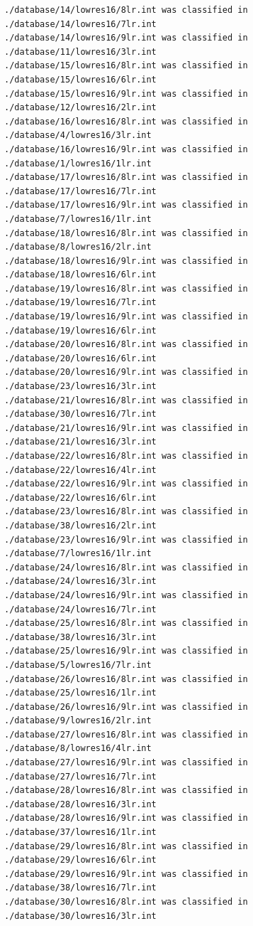 \documentclass[a4paper,11pt,titlepage]{article}
\begin{document}
\begin{verbatim}
./database/14/lowres16/8lr.int was classified in ./database/14/lowres16/7lr.int
./database/14/lowres16/9lr.int was classified in ./database/11/lowres16/3lr.int
./database/15/lowres16/8lr.int was classified in ./database/15/lowres16/6lr.int
./database/15/lowres16/9lr.int was classified in ./database/12/lowres16/2lr.int
./database/16/lowres16/8lr.int was classified in ./database/4/lowres16/3lr.int
./database/16/lowres16/9lr.int was classified in ./database/1/lowres16/1lr.int
./database/17/lowres16/8lr.int was classified in ./database/17/lowres16/7lr.int
./database/17/lowres16/9lr.int was classified in ./database/7/lowres16/1lr.int
./database/18/lowres16/8lr.int was classified in ./database/8/lowres16/2lr.int
./database/18/lowres16/9lr.int was classified in ./database/18/lowres16/6lr.int
./database/19/lowres16/8lr.int was classified in ./database/19/lowres16/7lr.int
./database/19/lowres16/9lr.int was classified in ./database/19/lowres16/6lr.int
./database/20/lowres16/8lr.int was classified in ./database/20/lowres16/6lr.int
./database/20/lowres16/9lr.int was classified in ./database/23/lowres16/3lr.int
./database/21/lowres16/8lr.int was classified in ./database/30/lowres16/7lr.int
./database/21/lowres16/9lr.int was classified in ./database/21/lowres16/3lr.int
./database/22/lowres16/8lr.int was classified in ./database/22/lowres16/4lr.int
./database/22/lowres16/9lr.int was classified in ./database/22/lowres16/6lr.int
./database/23/lowres16/8lr.int was classified in ./database/38/lowres16/2lr.int
./database/23/lowres16/9lr.int was classified in ./database/7/lowres16/1lr.int
./database/24/lowres16/8lr.int was classified in ./database/24/lowres16/3lr.int
./database/24/lowres16/9lr.int was classified in ./database/24/lowres16/7lr.int
./database/25/lowres16/8lr.int was classified in ./database/38/lowres16/3lr.int
./database/25/lowres16/9lr.int was classified in ./database/5/lowres16/7lr.int
./database/26/lowres16/8lr.int was classified in ./database/25/lowres16/1lr.int
./database/26/lowres16/9lr.int was classified in ./database/9/lowres16/2lr.int
./database/27/lowres16/8lr.int was classified in ./database/8/lowres16/4lr.int
./database/27/lowres16/9lr.int was classified in ./database/27/lowres16/7lr.int
./database/28/lowres16/8lr.int was classified in ./database/28/lowres16/3lr.int
./database/28/lowres16/9lr.int was classified in ./database/37/lowres16/1lr.int
./database/29/lowres16/8lr.int was classified in ./database/29/lowres16/6lr.int
./database/29/lowres16/9lr.int was classified in ./database/38/lowres16/7lr.int
./database/30/lowres16/8lr.int was classified in ./database/30/lowres16/3lr.int

\end{verbatim}
\end{document}
